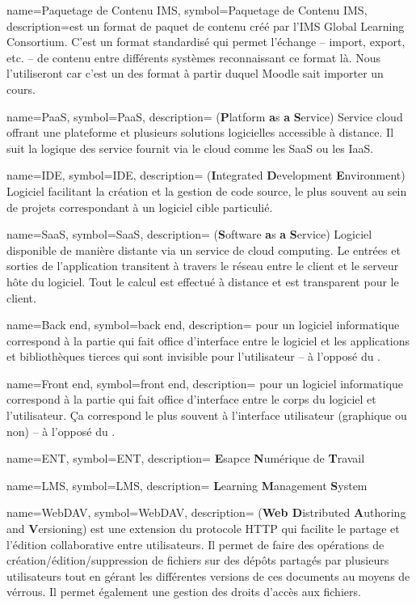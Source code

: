   {
	name=Paquetage de Contenu IMS,
	symbol=Paquetage de Contenu IMS,
	description={est un format de paquet de contenu créé par l'IMS Global Learning Consortium. C'est
un format standardisé qui permet l'échange -- import, export, etc. -- de contenu
entre différents systèmes reconnaissant ce format là. Nous l'utiliseront car
c'est un des format à partir duquel Moodle sait importer un cours.}}

  {
	name=PaaS,
	symbol=PaaS,
	description={
	  ({\bf P}latform {\bf a}s {\bf a} {\bf S}ervice) Service cloud
  offrant une plateforme et plusieurs solutions logicielles accessible à
distance. Il suit la logique des service fournit via le cloud comme les SaaS ou
les IaaS.}
}

  {
	name=IDE,
	symbol=IDE,
	description={
	  ({\bf I}ntegrated {\bf D}evelopment {\bf E}nvironment) Logiciel facilitant
	  la création et la gestion de code source, le plus souvent au sein de
	  projets correspondant à un logiciel cible particulié.
	}
  }

  {
	name=SaaS,
	symbol=SaaS,
	description={
	  ({\bf S}oftware {\bf a}s {\bf a} {\bf S}ervice) Logiciel disponible de
	  manière distante via un service de cloud computing. Le entrées et sorties
	  de l'application transitent à travers le réseau entre le client et le
	  serveur hôte du logiciel. Tout le calcul est effectué à distance et est
	  transparent pour le client.
	}
  }

  {
	name=Back end,
	symbol=back end,
	description={
	  pour un logiciel informatique correspond à la partie qui fait office
	  d'interface entre le logiciel et les applications et bibliothèques tierces
	  qui sont invisible pour l'utilisateur -- à l'opposé du .
	}
  }

  {
	name=Front end,
	symbol=front end,
	description={
	  pour un logiciel informatique correspond à la partie qui fait office
	  d'interface entre le corps du logiciel et l'utilisateur. Ça correspond le
	  plus souvent à l'interface utilisateur (graphique ou non) -- à l'opposé du
	  .
	}
  }

  {
	name=ENT,
	symbol=ENT,
	description={
	  {\bf E}sapce {\bf N}umérique de {\bf T}ravail
	}
  }

  {
	name=LMS,
	symbol=LMS,
	description={
	  {\bf L}earning {\bf M}anagement {\bf S}ystem
	}
  }

  {
	name=WebDAV,
	symbol=WebDAV,
	description={
	  ({\bf Web D}istributed {\bf A}uthoring and {\bf V}ersioning) est une
	  extension du protocole HTTP qui facilite le partage et l'édition
	  collaborative entre utilisateurs. Il permet de faire des opérations de
	  création/édition/suppression de fichiers sur des dépôts partagés par
	  plusieurs utilisateurs tout en gérant les différentes versions de ces
	  documents au moyens de vérrous. Il permet également une gestion des droits
	  d'accès aux fichiers.
	}
  }


